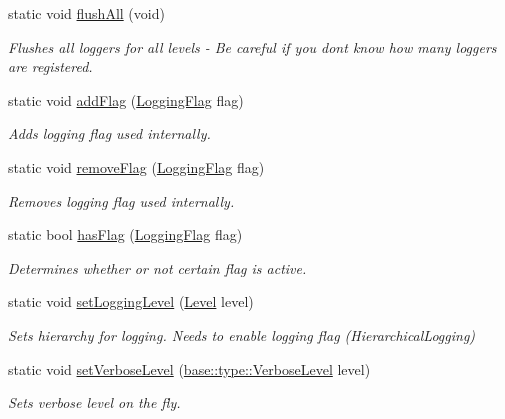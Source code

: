 \begin{DoxyCompactItemize}
static void \hyperlink{classel_1_1_loggers_a1834480e970c16817459ca3ee26b44b5}{flush\+All} (void)
\begin{DoxyCompactList}\small\item\em Flushes all loggers for all levels -\/ Be careful if you dont know how many loggers are registered. \end{DoxyCompactList}\item 
static void \hyperlink{classel_1_1_loggers_aedd2de02dd701b0f20ddaa10f1f728f1}{add\+Flag} (\hyperlink{namespaceel_a2784aacd04cb7816ac1c0b20fcbf83cb}{Logging\+Flag} flag)
\begin{DoxyCompactList}\small\item\em Adds logging flag used internally. \end{DoxyCompactList}\item 
static void \hyperlink{classel_1_1_loggers_a23fcb4b492f70a34285c45c0b5e2e515}{remove\+Flag} (\hyperlink{namespaceel_a2784aacd04cb7816ac1c0b20fcbf83cb}{Logging\+Flag} flag)
\begin{DoxyCompactList}\small\item\em Removes logging flag used internally. \end{DoxyCompactList}\item 
static bool \hyperlink{classel_1_1_loggers_a591a45565c1eb7073ec3a979df8b5a4c}{has\+Flag} (\hyperlink{namespaceel_a2784aacd04cb7816ac1c0b20fcbf83cb}{Logging\+Flag} flag)
\begin{DoxyCompactList}\small\item\em Determines whether or not certain flag is active. \end{DoxyCompactList}\item 
static void \hyperlink{classel_1_1_loggers_afbee019d722fef5148d8355f45ba7993}{set\+Logging\+Level} (\hyperlink{namespaceel_ab0ac6091262344c52dd2d3ad099e8e36}{Level} level)
\begin{DoxyCompactList}\small\item\em Sets hierarchy for logging. Needs to enable logging flag (Hierarchical\+Logging) \end{DoxyCompactList}\item 
static void \hyperlink{classel_1_1_loggers_a826b238fe4f3719305a2d19f0c121fa0}{set\+Verbose\+Level} (\hyperlink{namespaceel_1_1base_1_1type_a3f79fa74639a13c32f794ba074fe7fb4}{base\+::type\+::\+Verbose\+Level} level)
\begin{DoxyCompactList}\small\item\em Sets verbose level on the fly. \end{DoxyCompactList}\item 

\end{DoxyCompactItemize}
